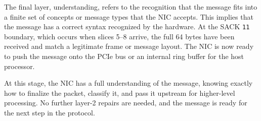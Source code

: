 \documentclass[../HFT-main.tex]{subfiles}
\begin{document}
The final layer, understanding, refers to the recognition that the message fits into a finite set of concepts or message types that the NIC accepts. This implies that the message has a correct syntax recognized by the hardware. At the SACK \texttt{11} boundary, which occurs when slices 5–8 arrive, the full 64 bytes have been received and match a legitimate frame or message layout. The NIC is now ready to push the message onto the PCIe bus or an internal ring buffer for the host processor.

At this stage, the NIC has a full understanding of the message, knowing exactly how to finalize the packet, classify it, and pass it upstream for higher-level processing. No further layer-2 repairs are needed, and the message is ready for the next step in the protocol.



%
%
%
%

%
\end{document}

